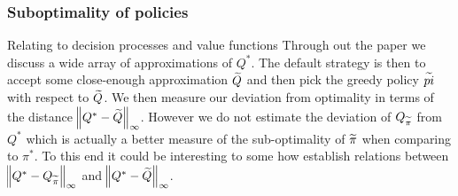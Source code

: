 

\subsubsection{Suboptimality of policies}
Relating to decision processes and value functions
Through out the paper we discuss a wide array of
approximations of $Q^*$.
The default strategy is then to accept some close-enough approximation $\widetilde{Q}$
and then pick the greedy policy $\widetilde{pi}$ with respect to $\widetilde{Q}$.
We then measure our deviation from optimality in terms of the distance
$\norm{Q^* - \widetilde{Q}}_\infty$.
However we do not estimate the deviation of
$Q_{\widetilde{\pi}}$ from $Q^*$ which is actually a better measure
of the sub-optimality of $\widetilde{\pi}$ when comparing to $\pi^*$.
To this end it could be interesting to some how establish relations
between
$\norm{Q^* - Q_{\widetilde{\pi}}}_\infty$ and $\norm{Q^* - \widetilde{Q}}_\infty$.
